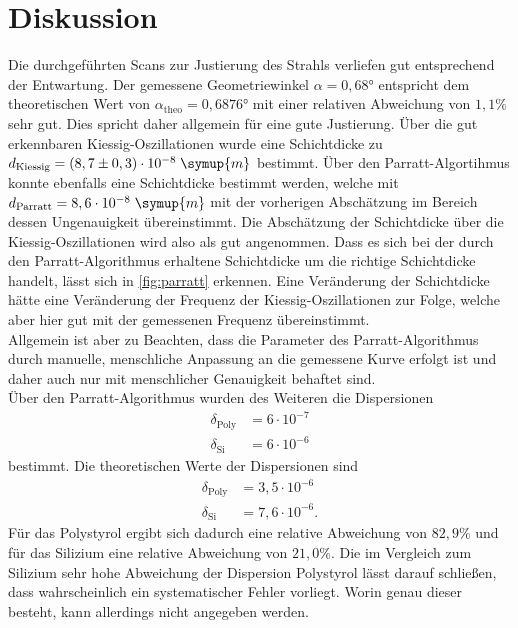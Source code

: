 \section{Diskussion}
Die durchgeführten Scans zur Justierung des Strahls verliefen gut entsprechend der Entwartung.
Der gemessene Geometriewinkel $\alpha = 0,68°$ entspricht dem theoretischen Wert von 
$\alpha_{\text{theo}} = 0,6876°$ mit einer relativen Abweichung von $1,1\%$ sehr gut.
Dies spricht daher allgemein für eine gute Justierung.
Über die gut erkennbaren Kiessig-Oszillationen wurde eine Schichtdicke zu
$d_{\text{Kiessig}} =(8,7 \pm 0,3)\cdot 10^{-8} \; \symup{m} $ bestimmt. Über den Parratt-Algortihmus 
konnte ebenfalls eine Schichtdicke bestimmt werden, welche mit 
$ d_{\text{Parratt}} = 8,6 \cdot 10^{-8} \;\symup{m}$ mit der vorherigen
Abschätzung im Bereich dessen Ungenauigkeit übereinstimmt. Die Abschätzung der Schichtdicke über die Kiessig-Oszillationen
wird also als gut angenommen. Dass es sich bei der durch den Parratt-Algorithmus erhaltene
Schichtdicke um die richtige Schichtdicke handelt, lässt sich in \autoref{fig:parratt} erkennen.
Eine Veränderung der Schichtdicke hätte eine Veränderung der Frequenz der Kiessig-Oszillationen
zur Folge, welche aber hier gut mit der gemessenen Frequenz übereinstimmt. \\
Allgemein ist aber zu Beachten, dass die Parameter des Parratt-Algorithmus durch manuelle,
menschliche Anpassung an die gemessene Kurve erfolgt ist und daher auch nur mit menschlicher 
Genauigkeit behaftet sind.\\
Über den Parratt-Algorithmus wurden des Weiteren die Dispersionen
\begin{align*}
    \delta_{\text{Poly}} &= 6 \cdot 10^{-7} \\
    \delta_{\text{Si}} &= 6 \cdot 10^{-6}
\end{align*}
bestimmt.
Die theoretischen Werte \cite{tolan} der Dispersionen sind 
\begin{align*}
    \delta_{\text{Poly}} &= 3,5 \cdot 10^{-6} \\
    \delta_{\text{Si}} &= 7,6 \cdot 10^{-6}.
\end{align*}
Für das Polystyrol ergibt sich dadurch eine relative Abweichung von $82,9 \%$ und 
für das Silizium eine relative Abweichung von $21,0\%$. Die im Vergleich zum Silizium sehr 
hohe Abweichung der Dispersion Polystyrol lässt darauf schließen, dass wahrscheinlich ein 
systematischer Fehler vorliegt. Worin genau dieser besteht, kann allerdings nicht angegeben werden.\\
